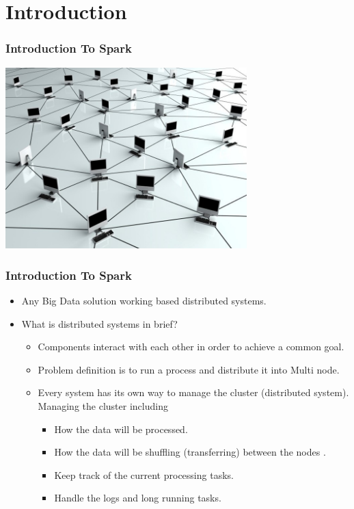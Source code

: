 \section{Introduction}


\begin{frame}
  \frametitle{Introduction To Spark}

\includegraphics[width=\textwidth,height=7cm]{Graphics/Dist.jpg}

\end{frame}

\begin{frame}
  \frametitle{Introduction To Spark}
	\begin{itemize}[<+->]
		\item Any Big Data solution working based distributed systems.
		\item What is distributed systems in brief?
			\begin{itemize}
					\item Components interact with each other in order to achieve a common goal.
					\item Problem definition is to run a process and distribute it into Multi node.
					\item Every system has its own way to manage the cluster (distributed system). Managing the cluster including 
						\begin{itemize}
							\item How the data will be processed.
							\item How the data will be shuffling (transferring) between the nodes .
							\item Keep track of the current processing tasks.
							\item Handle the logs and long running tasks.
						\end{itemize}
			\end{itemize}
	\end{itemize}
\end{frame}

